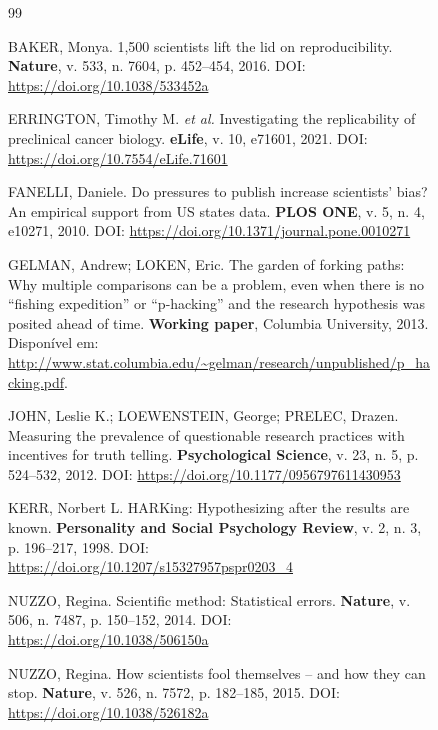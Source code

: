 \begin{figure}

\begin{thebibliography}{99}

BAKER, Monya.
1,500 scientists lift the lid on reproducibility.
\textbf{Nature}, v. 533, n. 7604, p. 452--454, 2016.
DOI: \url{https://doi.org/10.1038/533452a}

ERRINGTON, Timothy M. \textit{et al.}
Investigating the replicability of preclinical cancer biology.
\textbf{eLife}, v. 10, e71601, 2021.
DOI: \url{https://doi.org/10.7554/eLife.71601}

FANELLI, Daniele.
Do pressures to publish increase scientists' bias? An empirical
support from US states data.
\textbf{PLOS ONE}, v. 5, n. 4, e10271, 2010.
DOI: \url{https://doi.org/10.1371/journal.pone.0010271}

GELMAN, Andrew; LOKEN, Eric.
The garden of forking paths: Why multiple comparisons can be a
problem, even when there is no ``fishing expedition'' or
``p-hacking'' and the research hypothesis was posited ahead of time.
\textbf{Working paper}, Columbia University, 2013.
Disponível em: \url{http://www.stat.columbia.edu/~gelman/research/unpublished/p_hacking.pdf}.

JOHN, Leslie K.; LOEWENSTEIN, George; PRELEC, Drazen.
Measuring the prevalence of questionable research practices with
incentives for truth telling.
\textbf{Psychological Science}, v. 23, n. 5, p. 524--532, 2012.
DOI: \url{https://doi.org/10.1177/0956797611430953}

KERR, Norbert L.
HARKing: Hypothesizing after the results are known.
\textbf{Personality and Social Psychology Review}, v. 2, n. 3,
p. 196--217, 1998.
DOI: \url{https://doi.org/10.1207/s15327957pspr0203_4}

NUZZO, Regina.
Scientific method: Statistical errors.
\textbf{Nature}, v. 506, n. 7487, p. 150--152, 2014.
DOI: \url{https://doi.org/10.1038/506150a}

NUZZO, Regina.
How scientists fool themselves -- and how they can stop.
\textbf{Nature}, v. 526, n. 7572, p. 182--185, 2015.
DOI: \url{https://doi.org/10.1038/526182a}


\end{thebibliography}
\end{figure}
